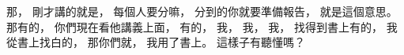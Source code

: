 \hypertarget{w01:cue:748}{}那，
\hypertarget{w01:cue:749}{}剛才講的就是，
\hypertarget{w01:cue:750}{}每個人要分嘛，
\hypertarget{w01:cue:751}{}分到的你就要準備報告，
\hypertarget{w01:cue:752}{}就是這個意思。
\hypertarget{w01:cue:753}{}那有的，
\hypertarget{w01:cue:754}{}你們現在看他講義上面，
\hypertarget{w01:cue:755}{}有的，
\hypertarget{w01:cue:756}{}我，
\hypertarget{w01:cue:757}{}我，
\hypertarget{w01:cue:758}{}我，
\hypertarget{w01:cue:759}{}找得到書上有的，
\hypertarget{w01:cue:760}{}我從書上找白的，
\hypertarget{w01:cue:761}{}那你們就，
\hypertarget{w01:cue:762}{}我用了書上。
\hypertarget{w01:cue:763}{}這樣子有聽懂嗎？

